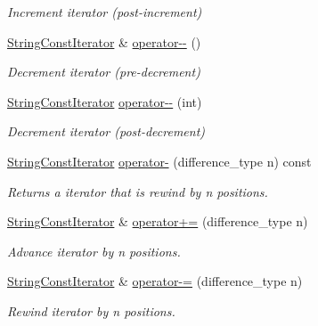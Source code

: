 \begin{DoxyCompactItemize}
\begin{DoxyCompactList}\small\item\em Increment iterator (post-\/increment) \end{DoxyCompactList}\item 
\hyperlink{struct_mdt_1_1_plain_text_1_1_string_const_iterator}{String\+Const\+Iterator} \& \hyperlink{struct_mdt_1_1_plain_text_1_1_string_const_iterator_a1d923d5a9c0cb79d2b794587660ad376}{operator-\/-\/} ()
\begin{DoxyCompactList}\small\item\em Decrement iterator (pre-\/decrement) \end{DoxyCompactList}\item 
\hyperlink{struct_mdt_1_1_plain_text_1_1_string_const_iterator}{String\+Const\+Iterator} \hyperlink{struct_mdt_1_1_plain_text_1_1_string_const_iterator_ac80031fc5261a7aaf0c2229946483efb}{operator-\/-\/} (int)
\begin{DoxyCompactList}\small\item\em Decrement iterator (post-\/decrement) \end{DoxyCompactList}\item 
\hyperlink{struct_mdt_1_1_plain_text_1_1_string_const_iterator}{String\+Const\+Iterator} \hyperlink{struct_mdt_1_1_plain_text_1_1_string_const_iterator_ac7fd84c109231856126ecd9443792296}{operator-\/} (difference\+\_\+type n) const 
\begin{DoxyCompactList}\small\item\em Returns a iterator that is rewind by n positions. \end{DoxyCompactList}\item 
\hyperlink{struct_mdt_1_1_plain_text_1_1_string_const_iterator}{String\+Const\+Iterator} \& \hyperlink{struct_mdt_1_1_plain_text_1_1_string_const_iterator_a2fdef53991d8a75174f6254ad4664c08}{operator+=} (difference\+\_\+type n)
\begin{DoxyCompactList}\small\item\em Advance iterator by n positions. \end{DoxyCompactList}\item 
\hyperlink{struct_mdt_1_1_plain_text_1_1_string_const_iterator}{String\+Const\+Iterator} \& \hyperlink{struct_mdt_1_1_plain_text_1_1_string_const_iterator_a20fc6889ac0e76812a993014f4d8e13b}{operator-\/=} (difference\+\_\+type n)
\begin{DoxyCompactList}\small\item\em Rewind iterator by n positions. \end{DoxyCompactList}\item 

\end{DoxyCompactItemize}
